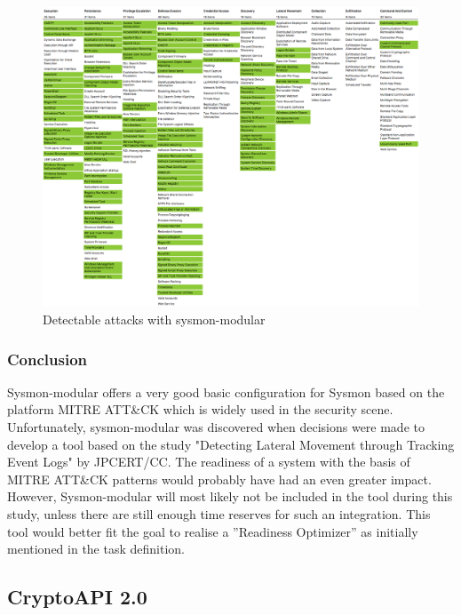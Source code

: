 \begin{figure}[H]
    \centering
    \includegraphics[width=1\linewidth]{assets/sysmon-modular/sysmon-modular.png}
    \caption{Detectable attacks with sysmon-modular}\label{fig:sysmonmodular}
\end{figure}

\subsubsection{Conclusion}
Sysmon-modular offers a very good basic configuration for Sysmon based on the platform MITRE ATT\&CK which is widely used in the security scene. Unfortunately, sysmon-modular was discovered when decisions were made to develop a tool based on the study "Detecting Lateral Movement through Tracking Event Logs" by JPCERT/CC. The readiness of a system with the basis of MITRE ATT\&CK patterns would probably have had an even greater impact. However, Sysmon-modular will most likely not be included in the tool during this study, unless there are still enough time reserves for such an integration. This tool would better fit the goal to realise a ''Readiness Optimizer'' as initially mentioned in the task definition.



\subsection{CryptoAPI 2.0} \label{CAPI2}
